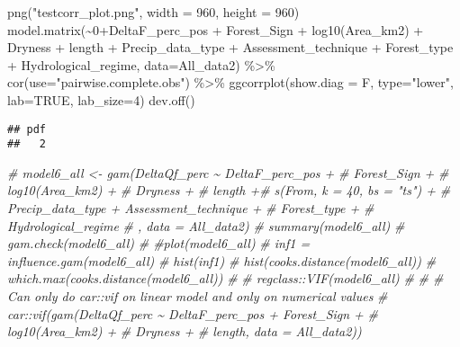 \documentclass[]{elsarticle} %
\newenvironment{Shaded}{\begin{snugshade}}{\end{snugshade}}
\newcommand{\AttributeTok}[1]{\textcolor[rgb]{0.77,0.63,0.00}{#1}}
\newcommand{\CommentTok}[1]{\textcolor[rgb]{0.56,0.35,0.01}{\textit{#1}}}
\newcommand{\ConstantTok}[1]{\textcolor[rgb]{0.00,0.00,0.00}{#1}}
\newcommand{\DecValTok}[1]{\textcolor[rgb]{0.00,0.00,0.81}{#1}}
\newcommand{\FunctionTok}[1]{\textcolor[rgb]{0.00,0.00,0.00}{#1}}
\newcommand{\NormalTok}[1]{#1}
\newcommand{\SpecialCharTok}[1]{\textcolor[rgb]{0.00,0.00,0.00}{#1}}
\newcommand{\StringTok}[1]{\textcolor[rgb]{0.31,0.60,0.02}{#1}}
\begin{document}
\begin{Shaded}
\begin{Highlighting}[]
\FunctionTok{png}\NormalTok{(}\StringTok{"testcorr\_plot.png"}\NormalTok{, }\AttributeTok{width =} \DecValTok{960}\NormalTok{, }\AttributeTok{height =} \DecValTok{960}\NormalTok{)}
\FunctionTok{model.matrix}\NormalTok{(}\SpecialCharTok{\textasciitilde{}}\DecValTok{0}\SpecialCharTok{+}\NormalTok{DeltaF\_perc\_pos }\SpecialCharTok{+} 
\NormalTok{                    Forest\_Sign }\SpecialCharTok{+} 
                   \FunctionTok{log10}\NormalTok{(Area\_km2) }\SpecialCharTok{+} 
\NormalTok{                    Dryness }\SpecialCharTok{+} 
\NormalTok{                    length }\SpecialCharTok{+}
\NormalTok{                    Precip\_data\_type }\SpecialCharTok{+}\NormalTok{  Assessment\_technique }\SpecialCharTok{+}
\NormalTok{                    Forest\_type }\SpecialCharTok{+}
\NormalTok{                    Hydrological\_regime, }\AttributeTok{data=}\NormalTok{All\_data2) }\SpecialCharTok{\%\textgreater{}\%} 
  \FunctionTok{cor}\NormalTok{(}\AttributeTok{use=}\StringTok{"pairwise.complete.obs"}\NormalTok{) }\SpecialCharTok{\%\textgreater{}\%} 
  \FunctionTok{ggcorrplot}\NormalTok{(}\AttributeTok{show.diag =}\NormalTok{ F, }\AttributeTok{type=}\StringTok{"lower"}\NormalTok{, }\AttributeTok{lab=}\ConstantTok{TRUE}\NormalTok{, }\AttributeTok{lab\_size=}\DecValTok{4}\NormalTok{)}
\FunctionTok{dev.off}\NormalTok{()}
\end{Highlighting}
\end{Shaded}

\begin{verbatim}
## pdf 
##   2
\end{verbatim}

\begin{Shaded}
\begin{Highlighting}[]
\CommentTok{\# model6\_all \textless{}{-} gam(DeltaQf\_perc \textasciitilde{} DeltaF\_perc\_pos + }
\CommentTok{\#                     Forest\_Sign + }
\CommentTok{\#                    log10(Area\_km2) + }
\CommentTok{\#                     Dryness + }
\CommentTok{\#                     length +\# s(From, k = 40, bs = "ts") +}
\CommentTok{\#                     Precip\_data\_type +  Assessment\_technique +}
\CommentTok{\#                     Forest\_type +}
\CommentTok{\#                     Hydrological\_regime}
\CommentTok{\#                     , data = All\_data2)}
\CommentTok{\# summary(model6\_all)}
\CommentTok{\# gam.check(model6\_all)}
\CommentTok{\# \#plot(model6\_all)}
\CommentTok{\# inf1 = influence.gam(model6\_all)}
\CommentTok{\# hist(inf1)}
\CommentTok{\# hist(cooks.distance(model6\_all))}
\CommentTok{\# which.max(cooks.distance(model6\_all))}
\CommentTok{\# }
\CommentTok{\# regclass::VIF(model6\_all)}
\CommentTok{\# }
\CommentTok{\# \# Can only do car::vif on linear model and only on numerical values}
\CommentTok{\# car::vif(gam(DeltaQf\_perc \textasciitilde{} DeltaF\_perc\_pos + Forest\_Sign + }
\CommentTok{\#                     log10(Area\_km2) + }
\CommentTok{\#                     Dryness + }
\CommentTok{\#                     length, data = All\_data2))}
\end{Highlighting}
\end{Shaded}
\end{document}
